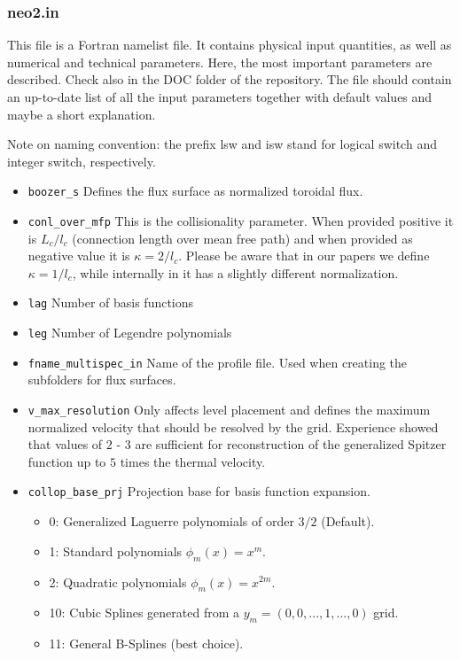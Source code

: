 \documentclass{article}
\newcommand{\vv}[1]{\texttt{\detokenize{#1}}}
\begin{document}
\subsubsection{neo2.in\label{running_preparation_neo2in}}
This file is a Fortran namelist file. It contains physical input
quantities, as well as numerical and technical parameters. Here, the
most important parameters are described.
Check also \vv{neo2.in.ql-full} in the DOC folder of the \vv{NEO-2}
repository. The file should contain an up-to-date list of all the input
parameters together with default values and maybe a short explanation.

Note on naming convention: the prefix lsw and isw stand for logical
switch and integer switch, respectively.

\begin{itemize}
 \item \verb|boozer_s| \newline
 Defines the flux surface as normalized toroidal flux.
 \item \verb|conl_over_mfp|\newline
 This is the collisionality parameter. When provided positive it is
 $L_c/l_c$ (connection length over mean free path) and when provided as
 negative value it is $\kappa = 2/l_c$. Please be aware that in our
 papers we define $\kappa = 1/l_c$, while internally in \vv{NEO-2} it has a
 slightly different normalization.
 \item \verb|lag|\newline
 Number of basis functions
 \item \verb|leg|\newline
 Number of Legendre polynomials
 \item \verb|fname_multispec_in|
 Name of the profile file. Used when creating the subfolders for flux
 surfaces.
 \item \verb|v_max_resolution|\newline
 Only affects level placement and defines the maximum normalized
 velocity that should be resolved by the grid. Experience showed that
 values of $2$ - $3$ are sufficient for reconstruction of the
 generalized Spitzer function up to $5$ times the thermal velocity.
 \item \verb|collop_base_prj|\newline
 Projection base for basis function expansion.
 \begin{itemize}
  \item 0: Generalized Laguerre polynomials of order $3/2$ (Default).
  \item 1: Standard polynomials $\phi_m(x) = x^m$.
  \item 2: Quadratic polynomials $\phi_m(x) = x^{2m}$.
  \item 10: Cubic Splines generated from a $y_m = (0, 0, ..., 1, ..., 0)$ grid.
  \item 11: General B-Splines (best choice).
 \end{itemize}


\end{itemize}
\end{document}
